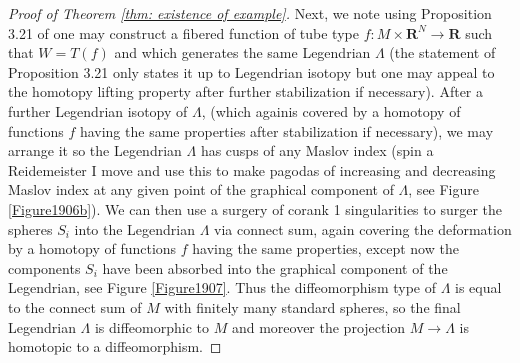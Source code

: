 \documentclass{amsart}
\def\bR{\mathbf{R}}
\theoremstyle{definition}
\theoremstyle{remark}
\newtheorem{inductive lemma}[theorem]{Inductive Lemma}
\begin{document}
\begin{proof}[Proof of Theorem \ref{thm: existence of example}]
Next, we note using Proposition 3.21 of \cite{ACGK} one may construct a fibered function of tube type $f:M \times \bR^N \to \bR$ such that $W=T(f)$ and which generates the same Legendrian $\Lambda$ (the statement of Proposition 3.21 only states it up to Legendrian isotopy but one may appeal to the homotopy lifting property after further stabilization if necessary). After a further Legendrian isotopy of $\Lambda$, (which againis covered by a homotopy of functions $f$ having the same properties after stabilization if necessary), we may arrange it so the Legendrian $\Lambda$ has cusps of any Maslov index (spin a Reidemeister I move and use this to make pagodas of increasing and decreasing Maslov index at any given point of the graphical component of $\Lambda$, see Figure \ref{Figure1906b}). We can then use a surgery of corank 1 singularities to surger the spheres $S_i$ into the Legendrian $\Lambda$ via connect sum, again covering the deformation by a homotopy of functions $f$ having the same properties, except now the components $S_i$ have been absorbed into the graphical component of the Legendrian, see Figure \ref{Figure1907}. Thus the diffeomorphism type of $\Lambda$ is equal to the connect sum of $M$ with finitely many standard spheres, so the final Legendrian $\Lambda$ is diffeomorphic to $M$ and moreover the projection $M \to \Lambda$ is homotopic to a diffeomorphism.   \end{proof}
\end{document}
